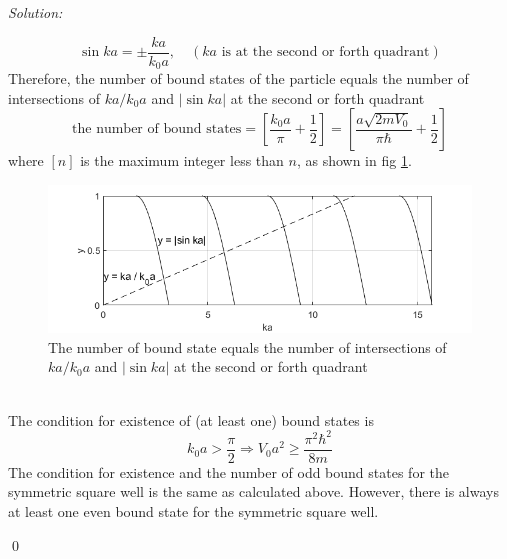 \documentclass[12pt,a4paper]{article}
\newenvironment{sol}
    {\emph{Solution:}
    }
    {
    \qed
    }
\begin{document}
\begin{sol}
\begin{itemize}
\begin{equation}
\sin ka=\pm\frac{ka}{k_0a},\quad(ka\text{ is at the second or forth quadrant})
\end{equation}
Therefore, the number of bound states of the particle equals the number of intersections of $ka/k_0a$ and $|\sin ka|$ at the second or forth quadrant
\begin{equation}
\text{the number of bound states}=\left[\frac{k_0a}{\pi}+\frac{1}{2}\right]=\left[\frac{a\sqrt{2mV_0}}{\pi\hbar}+\frac{1}{2}\right]
\end{equation}
where $[n]$ is the maximum integer less than $n$, as shown in fig \ref{problem_1}.
\begin{figure}[h]
\centering
\includegraphics[scale=.8]{problem_1.png}
\caption{The number of bound state equals the number of intersections of $ka/k_0a$ and $|\sin ka|$ at the second or forth quadrant}\label{problem_1}
\end{figure}
\\The condition for existence of (at least one) bound states is
\begin{equation}
k_0a>\frac{\pi}{2}\Longrightarrow V_0a^2\geq\frac{\pi^2\hbar^2}{8m}
\end{equation}
The condition for existence and the number of odd bound states for the symmetric square well is the same as calculated above. However, there is always at least one even bound state for the symmetric square well.
\end{itemize}
\end{sol}
\end{document}
